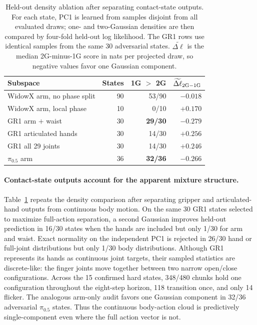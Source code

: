 \begin{table}[t]
\centering
\caption{Held-out density ablation after separating contact-state outputs.
For each state, PC1 is learned from samples disjoint from all evaluated draws;
one- and two-Gaussian densities are then compared by four-fold held-out log
likelihood. The GR1 rows use identical samples from the same 30 adversarial
states. $\widetilde{\Delta\ell}$ is the median 2G-minus-1G score in nats per
projected draw, so negative values favor one Gaussian component.}
\label{tab:continuous-density}
\small
\begin{tabular}{lrrr}
\toprule
Subspace & States & 1G $>$ 2G & $\widetilde{\Delta\ell}_{\rm 2G-1G}$ \\
\midrule
WidowX arm, no phase split & 90  & 53/90 & $-0.018$ \\
WidowX arm, local phase    & 10  & 0/10  & $+0.170$ \\
GR1 arm $+$ waist          & 30  & \textbf{29/30} & $\mathbf{-0.279}$ \\
GR1 articulated hands      & 30  & 14/30 & $+0.256$ \\
GR1 all 29 joints          & 30  & 14/30 & $+0.246$ \\
$\pi_{0.5}$ arm             & 36  & \textbf{32/36} & $\mathbf{-0.266}$ \\
\bottomrule
\end{tabular}
\end{table}

\paragraph{Contact-state outputs account for the apparent mixture structure.}
Table~\ref{tab:continuous-density} repeats the density comparison after
separating gripper and articulated-hand outputs from continuous body motion.
On the same 30 GR1 states selected to maximize full-action separation, a second
Gaussian improves held-out prediction in 16/30 states when the hands are
included but only 1/30 for arm and waist. Exact normality on the independent
PC1 is rejected in 26/30 hand or full-joint distributions but only 1/30 body
distributions. Although GR1 represents its hands as continuous joint targets,
their sampled statistics are discrete-like: the finger joints move together
between two narrow open/close configurations. Across the 15 confirmed hard
states, 348/480 chunks hold one configuration throughout the eight-step
horizon, 118 transition once, and only 14 flicker. The analogous arm-only
audit favors one Gaussian component in 32/36 adversarial $\pi_{0.5}$ states.
Thus the continuous body-action cloud is predictively single-component even
where the full action vector is not.

